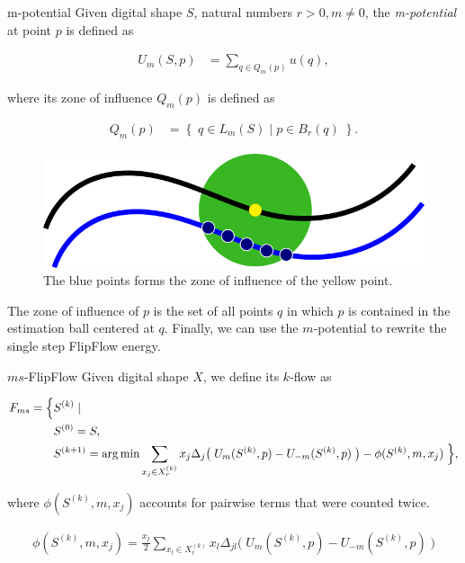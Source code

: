 \begin{definition}{m-potential}
Given digital shape $S$, natural numbers $r>0, m \neq 0$, the \emph{m-potential} at point $p$ is defined as

\begin{align*}
	U_{m}(S,p) &= \sum_{q \in Q_m(p)}{ u(q),}
\end{align*}

where its zone of influence $Q_m(p)$ is defined as

\begin{align*}
	Q_m(p) &= \left\{\; q \in L_m(S) \; | \; p \in B_r(q) \; \right\}.
\end{align*}

\end{definition}

\begin{figure}[h!]
\center
\includegraphics[scale=0.5]{figures/appendix-potential-elastica/k-potential.png}
\caption{The blue points forms the zone of influence of the yellow point.}
\label{fig:unbalance-set}
\end{figure}

The zone of influence of $p$ is the set of all points $q$ in which $p$ is contained in the estimation ball centered at $q$. Finally, we can use the $m$-potential to rewrite the single step FlipFlow energy.


\begin{definition}{$ms$-FlipFlow}
	Given digital shape $X$, we define its $k$-flow as
	
	\begin{align*}
		F_{ms} = \Big\{& S^{(k)} \; | \\
			& S^{(0)} = S,\\
		    &S^{(k+1)} = \operatorname*{arg\,min} \sum_{ x_j \in X_r^{(k)}}{ x_j \Delta _j\big(\; U_{m}(S^{(k)},p) - U_{-m}(S^{(k)},p) \;\big)} - \phi(S^{(k)},m,x_j) \; \Big\},
	\end{align*}
	
	where $\phi(S^{(k)},m,x_j)$ accounts for pairwise terms that were counted twice.
	
	\begin{align*}
	\phi(S^{(k)},m,x_j) = \frac{x_j}{2}\sum_{ x_l \in X_r^{(k)}}{x_l \Delta _{jl}\big(\; U_m(S^{(k)},p) - U_{-m}(S^{(k)},p) \;\big)} 
	\end{align*}
     	  
\end{definition}	

